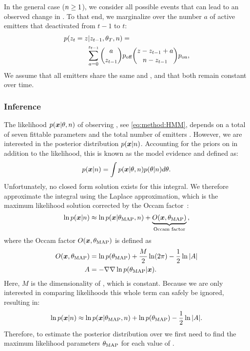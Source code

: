In the general case ($n\geq1$), we consider all possible events that can
lead to an observed change in \z{}. To that end, we marginalize over the
number $a$ of active emitters that deactivated from $t-1$ to $t$:
  \begin{align}
    \label{eq:method:transition}
    p(z_{t} = z | z_{t-1}, \theta_{T}, n) &=\\
    \sum_{a = 0}^{z_{t-1}}
      {a \choose z_{t-1}}
      &\poff
      {z - z_{t-1} + a \choose \n - z_{t-1}}
      \pon
      \text{,} \notag
  \end{align}
  We assume that all emitters share the same \pon and \poff, and that
  both remain constant over time.


\subsubsection{Inference}

The likelihood $p(\bm{x}|\theta,n)$ of observing \trace, see
\eqref{eq:method:HMM}, depends on a total of seven fittable parameters
\parameters and the total number of emitters \n.
  However, we are interested in the posterior distribution $p(\bm{x}|n)$.
  Accounting for the priors on \parameters in addition to the likelihood,
  this is known as the model evidence and defined as:
  \begin{equation*}
    p(\bm{x} | n) = \int p(\bm{x} | \theta, n) p(\theta | n) d\theta
    \text{.}
  \end{equation*}
  Unfortunately, no closed form solution exists for this integral. We therefore
  approximate the integral using the Laplace approximation, which is the
  maximum likelihood solution corrected by the Occam
  factor~\citep{bishop_pattern_2006}:
  \begin{equation}
    \ln p(\bm{x} | n) \approx
      \ln p(\bm{x} | \theta_\text{MAP}, n) +
      \underbrace{O(\bm{x}, \theta_\text{MAP})}_\text{Occam factor}
    \text{,}
    \label{eq:method:evidence_with_m}
  \end{equation}
  where the Occam factor $O(\bm{x}, \theta_\text{MAP})$ is defined as
  \begin{align*}
    O(\bm{x}, \theta_\text{MAP}) &=
      \ln p(\theta_\text{MAP}) +
      \frac{M}{2} \ln(2\pi) -
      \frac{1}{2} \ln |A|
    \\
    A &=
      -\nabla \nabla \ln p(\theta_\text{MAP} | \bm{x})
    \text{.}
  \end{align*}
  Here, $M$ is the dimensionality of \parameters, which is constant.
  Because we are only interested in comparing likelihoods this whole term can 
  safely be ignored, resulting in:
  \begin{equation}
    \ln p(\bm{x} | n) \approx \ln p(\bm{x} | \theta_\text{MAP}, n) + \ln p(\theta_\text{MAP}) - \frac{1}{2} \ln |A|
    \text{.}
    \label{eq:method:evidence}
  \end{equation}
  Therefore, to estimate the posterior distribution over \n we first need to 
  find the maximum likelihood parameters $\theta_\text{MAP}$ for each value of \n. 

